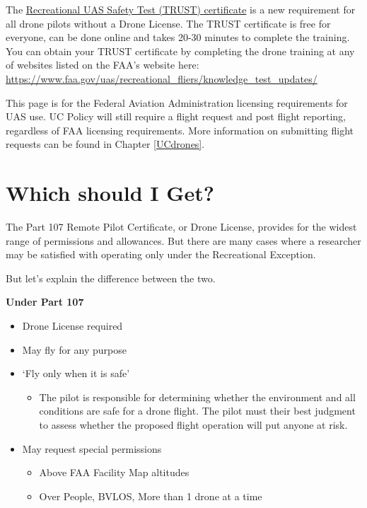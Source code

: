 \documentclass[
  12pt,
]{book}
\providecommand{\tightlist}{%
  \setlength{\itemsep}{0pt}\setlength{\parskip}{0pt}}
\newenvironment{notebox}{
  \definecolor{shadecolor}{gray}{.8}  %
  \color{black}
  \begin{shaded}}
 {\end{shaded}}
\begin{document}
The \hyperref[TRUST]{Recreational UAS Safety Test (TRUST) certificate} is a new requirement for all drone pilots without a Drone License. The TRUST certificate is free for everyone, can be done online and takes 20-30 minutes to complete the training. You can obtain your TRUST certificate by completing the drone training at any of websites listed on the FAA's website here: \url{https://www.faa.gov/uas/recreational_fliers/knowledge_test_updates/}

\begin{notebox}
This page is for the Federal Aviation Administration licensing requirements for UAS use. UC Policy will still require a flight request and post flight reporting, regardless of FAA licensing requirements. More information on submitting flight requests can be found in Chapter \ref{UCdrones}.

\end{notebox}

\section{Which should I Get?}\label{difference}

The Part 107 Remote Pilot Certificate, or Drone License, provides for the widest range of permissions and allowances. But there are many cases where a researcher may be satisfied with operating only under the Recreational Exception.

But let's explain the difference between the two.

\textbf{Under Part 107}

\begin{itemize}
\tightlist
\item
  Drone License required
\item
  May fly for any purpose
\item
  `Fly only when it is safe'

  \begin{itemize}
  \tightlist
  \item
    The pilot is responsible for determining whether the environment and all conditions are safe for a drone flight. The pilot must their best judgment to assess whether the proposed flight operation will put anyone at risk.
  \end{itemize}
\item
  May request special permissions

  \begin{itemize}
  \tightlist
  \item
    Above FAA Facility Map altitudes
  \item
    Over People, BVLOS, More than 1 drone at a time
  \end{itemize}
\end{itemize}
\end{document}
